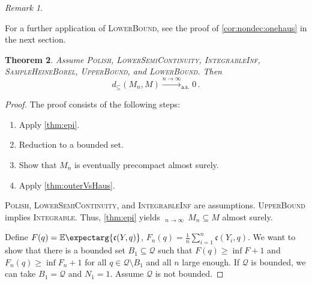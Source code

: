 \documentclass{scrartcl}
\renewcommand{\subset}{\subseteq}
\newcommand{\Ex}{\E\expectarg}
\newcommand*{\mc}[1]{\mathcal{#1}}
\newcommand*{\ms}[1]{\mathsf{#1}}
\newcommand*{\mf}[1]{\mathfrak{#1}}
\newcommand{\equationFullstop}{\, .}
\newcommand{\eqfs}{\equationFullstop}
\DeclareMathOperator*{\outerlim}{lim\, \overline{sup}}
\theoremstyle{plain}\newtheorem{theorem}{Theorem}[section]
\theoremstyle{definition}
\theoremstyle{remark}
\newtheorem{remark}[theorem]{Remark}
\begin{document}
\begin{remark}
\begin{itemize}
	For a further application of \textsc{LowerBound}, see the proof of \autoref{cor:nondec:onehaus} in the next section.
\end{itemize}
\end{remark}
\begin{theorem}\label{thm:consistency}
	Assume \textsc{Polish}, \textsc{LowerSemiContinuity}, \textsc{IntegrableInf},  \textsc{SampleHeineBorel}, \textsc{UpperBound}, and \textsc{LowerBound}. Then
	\begin{equation*}
		d_\subset(M_n, M) \xrightarrow{n\to\infty}_{\ms{a.s.}} 0
		\eqfs
	\end{equation*}
\end{theorem}
\begin{proof}
The proof consists of the following steps:
\begin{enumerate}
\item Apply \autoref{thm:epi}.
\item Reduction to a bounded set.
\item Show that $M_n$ is eventually precompact almost surely.
\item Apply \autoref{thm:outerVsHaus}.
\end{enumerate}
\noindent
\underline{}
\textsc{Polish}, \textsc{LowerSemiContinuity}, and \textsc{IntegrableInf} are assumptions. \textsc{UpperBound} implies \textsc{Integrable}. Thus, \autoref{thm:epi} yields $\outerlim_{n\to\infty}\, M_n \subset M$ almost surely.

\noindent
\underline{}
Define $F(q) = \Ex{\mf c(Y, q)}$, $F_n(q) = \frac1n\sum_{i=1}^n \mf c(Y_i, q)$.
We want to show that there is a bounded set $B_1 \subset \mc Q$ such that $F(q) \geq \inf F + 1$ and $F_n(q) \geq \inf F_n + 1$ for all $q\in \mc Q \setminus B_1$ and all $n$ large enough. If $\mc Q$ is bounded, we can take $B_1 = \mc Q$ and $N_1 = 1$. Assume $\mc Q$ is not bounded.


\end{proof}
\end{document}
